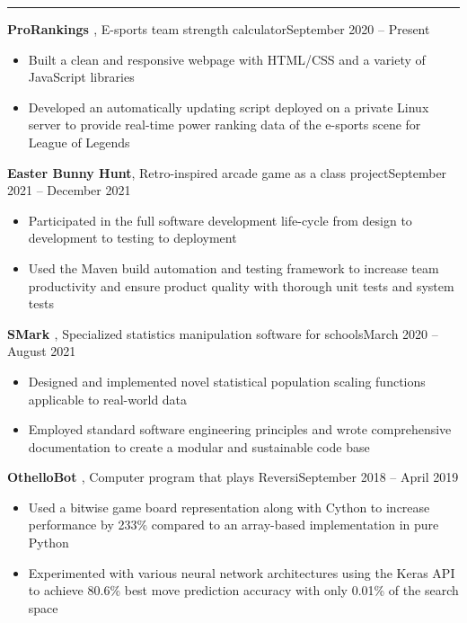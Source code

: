 \documentclass{article}
\newcommand{\entrytitle}[3]{\vspace{0.5em}\textbf{#1}, {\small #2}\hfill #3}
\renewcommand{\section}[1]{\vspace{1em}{\Large #1}\vspace{0.3em}\hrule}
\newenvironment{entrybody}{\begin{itemize}[itemsep=0.3em]}{\end{itemize}}
\begin{document}
\section{Projects}

\entrytitle{ProRankings \href{https://github.com/xtevenx/ProRankings}{\faGithub}} %
    {E-sports team strength calculator}{September 2020 – Present}
\begin{entrybody}
\item Built a clean and responsive webpage with HTML/CSS and a variety of JavaScript libraries
\item
    Developed an automatically updating script deployed on a private Linux server to provide
    real-time power ranking data of the e-sports scene for League of Legends
\end{entrybody}

\entrytitle{Easter Bunny Hunt} %
    {Retro-inspired arcade game as a class project}{September 2021 – December 2021}
\begin{entrybody}
\item
    Participated in the full software development life-cycle from design to development to
    testing to deployment
\item
    Used the Maven build automation and testing framework to increase team productivity and
    ensure product quality with thorough unit tests and system tests
\end{entrybody}

\entrytitle{SMark \href{https://github.com/xtevenx/SMark}{\faGithub}} %
    {Specialized statistics manipulation software for schools}{March 2020 – August 2021}
\begin{entrybody}
\item
    Designed and implemented novel statistical population scaling functions applicable to
    real-world data
\item
    Employed standard software engineering principles and wrote comprehensive documentation to
    create a modular and sustainable code base
\end{entrybody}

\entrytitle{OthelloBot \href{https://github.com/xtevenx/othello-bot}{\faGithub}} %
    {Computer program that plays Reversi}{September 2018 – April 2019}
\begin{entrybody}
\item  %
    Used a bitwise game board representation along with Cython to increase performance by 233\%
    compared to an array-based implementation in pure Python
\item  %
    Experimented with various neural network architectures using the Keras API to achieve 80.6\%
    best move prediction accuracy with only 0.01\% of the search space
\end{entrybody}
\end{document}
